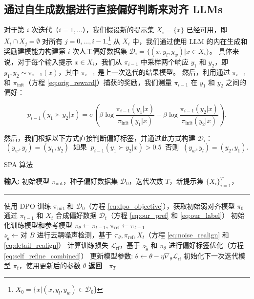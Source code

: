 \subsection{通过自生成数据进行直接偏好判断来对齐 LLMs}\label{sec:method:data_expansion}

对于第 $i$ 次迭代（$i=1, \dots$），我们假设新的提示集 $X_{i}=\{x\}$ 已经可用，即 $X_{i} \cap X_{j} = \emptyset$ 对所有 $j=0, \dots, i-1$.\footnote{$X_{0}=\{x|(x,y_l,y_w) \in \mathcal{D}_{0}$\}} 
从 $X_{i}$ 中，我们通过使用 LLM 的内在生成和奖励建模能力构建第 $i$ 次人工偏好数据集 $\mathcal{D}_{i}=\{(x,y_l,y_w)|x \in X_{i}\}$。
具体来说，对于每个输入提示 $x \in X_{i}$，我们从 $\pi_{i-1}$ 中采样两个响应 $y_1$ 和 $y_2$，即 $y_1, y_2 \sim \pi_{i-1}(x)$，其中 $\pi_{i-1}$ 是上一次迭代的结果模型。
然后，利用通过 $\pi_{i-1}$ 和 $\pi_{\text{init}}$（方程 \ref{eq:orig_reward}）捕获的奖励，我们测量 $\pi_{i-1}$ 在 $y_1$ 和 $y_2$ 之间的偏好：

\begin{equation}\label{eq:our_pref}
    p_{i-1}(y_{1} \succ y_{2} | x) = \sigma \left(\beta \log \frac{\pi_{i-1}(y_1|x)}{\pi_{\text{init}}(y_1|x)} - \beta \log \frac{\pi_{i-1}(y_2|x)}{\pi_{\text{init}}(y_2|x)}\right).
\end{equation}

然后，我们根据以下方式直接判断偏好标签，并通过此方式构建 $\mathcal{D}_{i}$：
\begin{equation}\label{eq:our_label}
    (y_{w}, y_{l}) = (y_{1}, y_{2})~\text{ 如果 }~p_{i-1}(y_{1} \succ y_{2} | x) > 0.5~\text{ 否则 }~(y_{w}, y_{l}) = (y_{2}, y_{1}).
\end{equation}

\begin{algorithm}[t!]
    \caption{SPA 算法}
    \label{alg:main}
 \begin{algorithmic}
   \STATE
   \textbf{输入:} 初始模型 $\pi_{\text{init}}$，种子偏好数据集 $\mathcal{D}_{0}$，迭代次数 $T$，新提示集 $\{X_{i}\}_{i=1}^{T}$，  
   \vspace{0.05in} 
   \hrule
   \vspace{0.05in}  
   \STATE 使用 DPO 训练 $\pi_{\text{init}}$ 和 $\mathcal{D}_{0}$（方程 \ref{eq:dpo_objective}），获取初始弱对齐模型 $\pi_{0}$  
   \STATE 通过 $\pi_{t-1}$ 和 ${X}_{t}$ 合成偏好数据 $\mathcal{D}_{t}$（方程 \ref{eq:our_pref} 和 \ref{eq:our_label}）
   \STATE 初始化训练模型和参考模型 $\pi_{\theta} \leftarrow \pi_{t-1}$, $\pi_{\text{ref}} \leftarrow \pi_{t-1}$  
   \STATE $z_{\widetilde{\theta}} \leftarrow \text{对 } B \text{ 进行去耦噪声检测，基于 } \pi_{\theta}, \pi_{\text{ref}}, {X}_{t}$（方程 \ref{eq:noise_realign} 和 \ref{eq:detail_realign}）
   \STATE 计算训练损失 $\mathcal{L}_{\text{rf}}$，基于 $z_{\widetilde{\theta}}$ 和 $\pi_{\theta}$ 进行偏好标签优化（方程 \ref{eq:self_refine_combined}）
   \STATE 更新模型参数: $\theta \leftarrow \theta - \eta  \nabla_{\theta}\mathcal{L}_{\text{rf}}$
   \ENDFOR
   \STATE 初始化下一次迭代模型 $\pi_{t}$，使用更新后的参数 $\theta$
   \ENDFOR
   \STATE \textbf{返回}~~$\pi_{T}$
 \end{algorithmic}
\end{algorithm}

